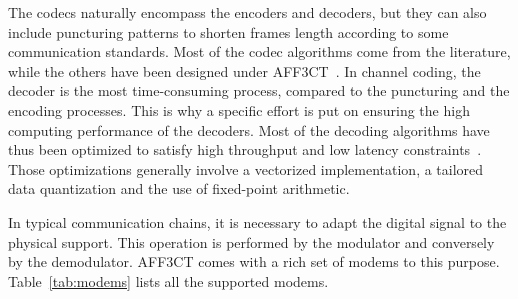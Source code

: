 \documentclass[11pt]{report}
\newcommand{\AFFECT}{AFF3CT\xspace}
\begin{document}
The codecs naturally encompass the encoders and decoders, but they can also
include puncturing patterns to shorten frames length according to some
communication standards. Most of the codec algorithms come from the literature,
while the others have been designed under
\AFFECT~\cite{Tonnellier2016a,Tonnellier2016b,Tonnellier2016,leonardon:hal-01987848}.
In channel coding, the decoder is the most time-consuming process, compared to
the puncturing and the encoding processes. This is why a specific effort is put
on ensuring the high computing performance of the decoders. Most of the decoding
algorithms have thus been optimized to satisfy high throughput and low latency
constraints~\cite{LeGal2015a,Cassagne2015c,Cassagne2016a,Cassagne2016b}. Those
optimizations generally involve a vectorized implementation, a tailored data
quantization and the use of fixed-point arithmetic.

In typical communication chains, it is necessary to adapt the digital signal
to the physical support. This operation is performed by the modulator and
conversely by the demodulator. \AFFECT comes with a rich set of modems to this
purpose. Table~\ref{tab:modems} lists all the supported modems.
\end{document}
